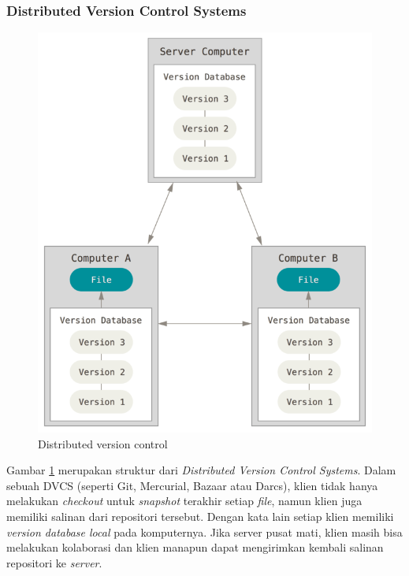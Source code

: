 \subsubsection{Distributed Version Control Systems}
\begin{figure}[H]
	\centering
		\includegraphics[scale=0.5]{Gambar/dvcs.png}
	\caption{Distributed version control}
	\label{fig:dvcs}
\end{figure}
Gambar \ref{fig:dvcs} merupakan struktur dari \textit{Distributed Version Control Systems}. Dalam sebuah DVCS (seperti Git, Mercurial, Bazaar atau Darcs), klien tidak hanya melakukan \textit{checkout} untuk \textit{snapshot} terakhir setiap \textit{file}, namun klien juga memiliki salinan dari repositori tersebut\cite{chacon2014pro}. Dengan kata lain setiap klien memiliki \textit{version database local} pada komputernya. Jika server pusat mati, klien masih bisa melakukan kolaborasi dan klien manapun dapat mengirimkan kembali salinan repositori ke \textit{server}.

